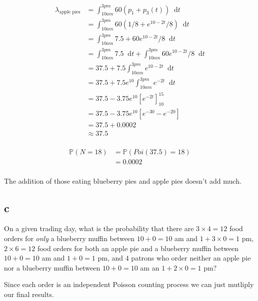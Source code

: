 \documentclass{article}
\newcommand{\diff}{\mathop{}\!\mathrm{d}}
\newcommand{\prob}{\mathbb{P}}
\begin{document}
\begin{align*}
    \lambda_{\text{apple pies}}
    &= \int_{10am}^{3pm} 60 (p_1 + p_3(t)) \diff t \\
    &= \int_{10am}^{3pm} 60 (1/8 + e^{10 - 2t}/8) \diff t \\
    &= \int_{10am}^{3pm} 7.5 + 60 e^{10 - 2t}/8 \diff t \\
    &= \int_{10am}^{3pm} 7.5 \diff t
    + \int_{10am}^{3pm} 60 e^{10 - 2t}/8 \diff t \\
    &= 37.5 + 7.5 \int_{10am}^{3pm} e^{10 - 2t} \diff t \\
    &= 37.5 + 7.5 e^{10} \int_{10am}^{3pm} e^{-2t} \diff t \\
    &= 37.5 - 3.75 e^{10} \left[e^{-2t}\right]_{10}^{15} \\
    &= 37.5 - 3.75 e^{10} \left[e^{-30} - e^{-20}\right] \\
    &= 37.5 + 0.0002 \\
    &\approx 37.5 \\
\end{align*}

\begin{align*}
    \prob(N = 18) &= \prob(Poi(37.5) = 18) \\
    &= 0.0002 \\
\end{align*}

The addition of those eating blueberry pies and apple pies doesn't add much.

\subsection{c}
On a given trading day, what is the probability that there are $3 \times 4 = 12$
food orders for \textit{only} a blueberry muffin between $10 + 0 = 10$ am and
$1 + 3 \times 0 = 1$ pm, $2 \times 6 = 12$ food orders for both an apple pie and
a blueberry muffin between $10 + 0 = 10$ am and $1 + 0 = 1$ pm, and $4$ patrons
who order neither an apple pie nor a blueberry muffin between $10 + 0 = 10$ am
an $1 + 2 \times 0 = 1$ pm?

Since each order is an independent Poisson counting process we can just mutliply
our final results.
\end{document}
